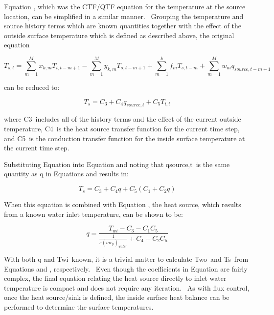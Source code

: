 Equation , which was the CTF/QTF equation for the temperature at the source location, can be simplified in a similar manner.~ Grouping the temperature and source history terms which are known quantities together with the effect of the outside surface temperature which is defined as described above, the original equation

\begin{equation}
{T_{s,t}} = \sum\limits_{m = 1}^M {{x_{k,m}}{T_{i,t - m + 1}}}  - \sum\limits_{m = 1}^M {{y_{k,m}}{T_{o,t - m + 1}}}  + \sum\limits_{m = 1}^k {{f_m}{T_{s,t - m}}}  + \sum\limits_{m = 1}^M {{w_m}{q_{source,t - m + 1}}}
\end{equation}

can be reduced to:

\begin{equation}
{T_s} = {C_3} + {C_4}{q_{source,t}} + {C_5}{T_{i,t}}
\end{equation}

where C3~includes all of the history terms and the effect of the current outside temperature, C4~is the heat source transfer function for the current time step, and C5~is the conduction transfer function for the inside surface temperature at the current time step.

Substituting Equation into Equation and noting that qsource,t~is the same quantity as q in Equations and results in:

\begin{equation}
{T_s} = {C_3} + {C_4}q + {C_5}\left( {{C_1} + {C_2}q} \right)
\end{equation}

When this equation is combined with Equation , the heat source, which results from a known water inlet temperature, can be shown to be:

\begin{equation}
q = \frac{{{T_{wi}} - {C_3} - {C_1}{C_5}}}{{\frac{1}{{\varepsilon {{\left( {\dot m{c_p}} \right)}_{water}}}} + {C_4} + {C_2}{C_5}}}
\end{equation}

With both q and Twi~known, it is a trivial matter to calculate Two~and Ts~from Equations and , respectively.~ Even though the coefficients in Equation are fairly complex, the final equation relating the heat source directly to inlet water temperature is compact and does not require any iteration.~ As with flux control, once the heat source/sink is defined, the inside surface heat balance can be performed to determine the surface temperatures.

